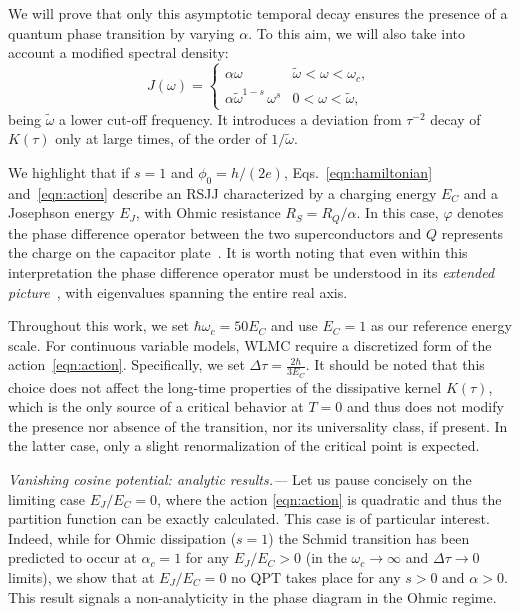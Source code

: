 \documentclass[aps,notitlepage,twocolumn,prl,nolongbibliography,superscriptaddress]{revtex4-2}
\begin{document}
We will prove that only this asymptotic temporal decay ensures the presence of a quantum phase transition by varying $\alpha$. To this aim, we will also take into account a modified spectral density:
\begin{equation}\label{eqn:spectral_form2}
J(\omega) =
\begin{cases}
\alpha\omega & {\tilde \omega} <\omega<\omega_c, \\
\alpha{\tilde\omega}^{1-s} \, \omega^s & 0<\omega<{\tilde\omega},
\end{cases}
\end{equation}
being $\tilde{\omega}$ a lower cut-off frequency. It introduces a deviation from ${\tau^{-2}}$ decay of $K(\tau)$ only at large times, of the order of $1/\tilde{\omega}$.

We highlight that if $s=1$ and $\phi_0 = h/(2e)$, Eqs.~\eqref{eqn:hamiltonian} and~\eqref{eqn:action} describe an RSJJ characterized by a charging energy $E_C$ and a Josephson energy $E_J$, with Ohmic resistance $R_S = R_Q/\alpha$. In this case, $\varphi$ denotes the phase difference operator between the two superconductors and $Q$ represents the charge on the capacitor plate~\cite{Vool-Devoret, Schon_Zaikin_review}. It is worth noting that even within this interpretation the phase difference operator must be understood in its \textit{extended picture}~\cite{Likharev,Averin,Comment_absence_Hakonen_Sonin}, with eigenvalues spanning the entire real axis.

Throughout this work, we set $\hbar\omega_c = 50E_C$ and use $E_C=1$ as our reference energy scale. For continuous variable models, WLMC require a discretized form of the action~\eqref{eqn:action}. Specifically, we set $\Delta \tau = \frac{2\hbar}{3E_C}$. It should be noted that this choice does not affect the long-time properties of the dissipative kernel $K(\tau)$, which is the only source of a critical behavior at $T=0$ and thus does not modify the presence nor absence of the transition, nor its universality class, if present. In the latter case, only a slight renormalization of the critical point is expected.

\textit{Vanishing cosine potential: analytic results.---}
Let us pause concisely on the limiting case $E_J/E_C = 0$, where the action \eqref{eqn:action} is quadratic and thus the partition function can be exactly calculated. This case is of particular interest. Indeed, while for Ohmic dissipation ($s=1$) the Schmid transition has been predicted to occur at $\alpha_c=1$ for any $E_J/E_C > 0$ (in the $\omega_c \to \infty$ and $\Delta \tau \to 0$ limits), we show that at $E_J/E_C = 0$ no QPT takes place for any $s > 0$ and $\alpha > 0$. This result signals a non-analyticity in the phase diagram in the Ohmic regime.
\end{document}
